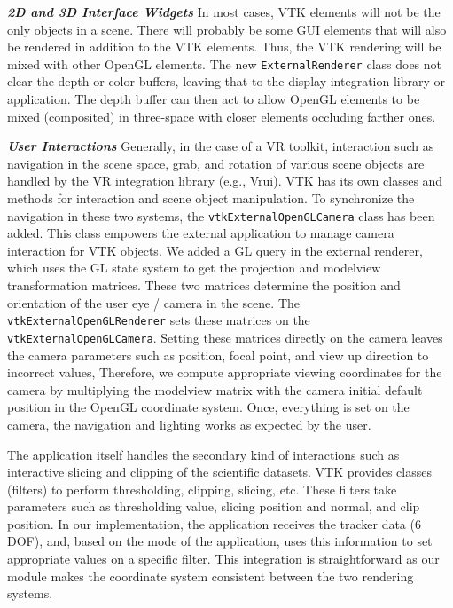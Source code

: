 \textbf{\textit{2D and 3D Interface Widgets}} In most cases, VTK elements will not be the only objects in a scene.
There will probably be some GUI elements that will also be rendered in addition to the VTK elements.
Thus, the VTK rendering will be mixed with other OpenGL elements.
The new \texttt{ExternalRenderer} class does not clear the depth or color buffers, leaving that to the display integration library or application.
The depth buffer can then act to allow OpenGL elements to be mixed (composited) in three-space with closer elements occluding farther ones.

\textbf{\textit{User Interactions}} Generally, in the case of a VR toolkit, interaction such as navigation in the scene space, grab, and rotation of various scene objects are handled by the VR integration library (e.g., Vrui).
VTK has its own classes and methods for interaction and scene object manipulation.
To synchronize the navigation in these two systems, the \texttt{vtkExternalOpenGLCamera} class has been added.
This class empowers the external application to manage camera interaction for VTK objects.
We added a GL query in the external renderer, which uses the GL state system to get the projection and modelview transformation matrices.
These two matrices determine the position and orientation of the user eye /
camera in the scene.
The \texttt{vtkExternalOpenGLRenderer} sets these matrices on the \texttt{vtkExternalOpenGLCamera}.
Setting these matrices directly on the camera leaves the camera parameters such as position, focal point, and view up direction to incorrect values, Therefore, we compute appropriate viewing coordinates for the camera by multiplying the modelview matrix with the camera initial default position in the OpenGL coordinate system. 
Once, everything is set on the camera, the navigation and lighting works as expected by the user.

The application itself handles the secondary kind of interactions such as interactive slicing and clipping of the scientific datasets.
VTK provides classes (filters) to perform thresholding, clipping, slicing, etc.
These filters take parameters such as thresholding value, slicing position and normal, and clip position. 
In our implementation, the application receives the tracker data (6 DOF), and, based on the mode of the application, uses this information to set appropriate values on a specific filter.
This integration is straightforward as our module makes the coordinate system consistent between the two rendering systems.

